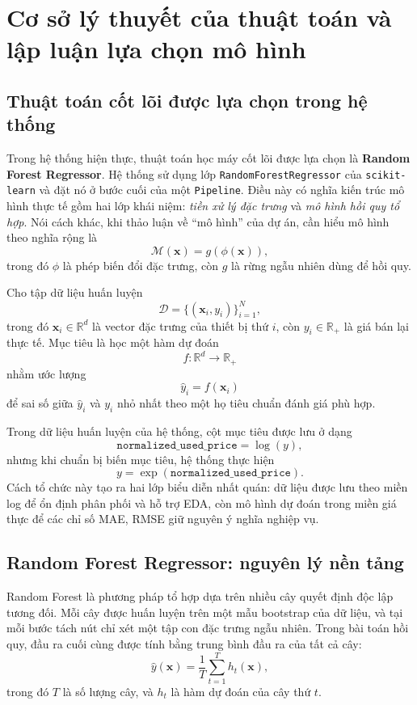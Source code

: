 \section{Cơ sở lý thuyết của thuật toán và lập luận lựa chọn mô hình}

\subsection{Thuật toán cốt lõi được lựa chọn trong hệ thống}

Trong hệ thống hiện thực, thuật toán học máy cốt lõi được lựa chọn là \textbf{Random Forest Regressor}. Hệ thống sử dụng lớp \texttt{RandomForestRegressor} của \texttt{scikit-learn} và đặt nó ở bước cuối của một \texttt{Pipeline}. Điều này có nghĩa kiến trúc mô hình thực tế gồm hai lớp khái niệm: \textit{tiền xử lý đặc trưng} và \textit{mô hình hồi quy tổ hợp}. Nói cách khác, khi thảo luận về ``mô hình'' của dự án, cần hiểu mô hình theo nghĩa rộng là
$$
\mathcal{M}(\mathbf{x}) = g(\phi(\mathbf{x})),
$$
trong đó $\phi$ là phép biến đổi đặc trưng, còn $g$ là rừng ngẫu nhiên dùng để hồi quy.


Cho tập dữ liệu huấn luyện
$$
\mathcal{D} = \{(\mathbf{x}_i, y_i)\}_{i=1}^{N},
$$
trong đó $\mathbf{x}_i \in \mathbb{R}^d$ là vector đặc trưng của thiết bị thứ $i$, còn $y_i \in \mathbb{R}_+$ là giá bán lại thực tế. Mục tiêu là học một hàm dự đoán
$$
f: \mathbb{R}^d \to \mathbb{R}_+
$$
nhằm ước lượng
$$
\hat{y}_i = f(\mathbf{x}_i)
$$
để sai số giữa $\hat{y}_i$ và $y_i$ nhỏ nhất theo một họ tiêu chuẩn đánh giá phù hợp.

Trong dữ liệu huấn luyện của hệ thống, cột mục tiêu được lưu ở dạng
$$
\texttt{normalized\_used\_price} = \log(y),
$$
nhưng khi chuẩn bị biến mục tiêu, hệ thống thực hiện
$$
y = \exp(\texttt{normalized\_used\_price}).
$$
Cách tổ chức này tạo ra hai lớp biểu diễn nhất quán: dữ liệu được lưu theo miền log để ổn định phân phối và hỗ trợ EDA, còn mô hình dự đoán trong miền giá thực để các chỉ số MAE, RMSE giữ nguyên ý nghĩa nghiệp vụ.

\subsection{Random Forest Regressor: nguyên lý nền tảng}

Random Forest là phương pháp tổ hợp dựa trên nhiều cây quyết định độc lập tương đối. Mỗi cây được huấn luyện trên một mẫu bootstrap của dữ liệu, và tại mỗi bước tách nút chỉ xét một tập con đặc trưng ngẫu nhiên. Trong bài toán hồi quy, đầu ra cuối cùng được tính bằng trung bình đầu ra của tất cả cây:
$$
\hat{y}(\mathbf{x}) = \frac{1}{T} \sum_{t=1}^{T} h_t(\mathbf{x}),
$$
trong đó $T$ là số lượng cây, và $h_t$ là hàm dự đoán của cây thứ $t$.

